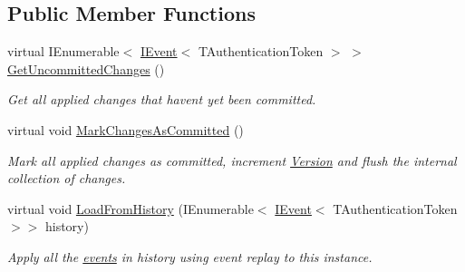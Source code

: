 \subsection*{Public Member Functions}
\begin{DoxyCompactItemize}
\item 
virtual I\+Enumerable$<$ \hyperlink{interfaceCqrs_1_1Events_1_1IEvent}{I\+Event}$<$ T\+Authentication\+Token $>$ $>$ \hyperlink{classCqrs_1_1Akka_1_1Domain_1_1AkkaAggregateRootProxy_afa620ced4762b0539da23ca063fed489_afa620ced4762b0539da23ca063fed489}{Get\+Uncommitted\+Changes} ()
\begin{DoxyCompactList}\small\item\em Get all applied changes that haven\textquotesingle{}t yet been committed. \end{DoxyCompactList}\item 
virtual void \hyperlink{classCqrs_1_1Akka_1_1Domain_1_1AkkaAggregateRootProxy_aaa8a46fee21b6133ae4d1b2f60983d7e_aaa8a46fee21b6133ae4d1b2f60983d7e}{Mark\+Changes\+As\+Committed} ()
\begin{DoxyCompactList}\small\item\em Mark all applied changes as committed, increment \hyperlink{classCqrs_1_1Akka_1_1Domain_1_1AkkaAggregateRootProxy_a24ff2ddef0d416ac5b936c1887ac2154_a24ff2ddef0d416ac5b936c1887ac2154}{Version} and flush the internal collection of changes. \end{DoxyCompactList}\item 
virtual void \hyperlink{classCqrs_1_1Akka_1_1Domain_1_1AkkaAggregateRootProxy_ae611077a51a215aef7fd0e106734b386_ae611077a51a215aef7fd0e106734b386}{Load\+From\+History} (I\+Enumerable$<$ \hyperlink{interfaceCqrs_1_1Events_1_1IEvent}{I\+Event}$<$ T\+Authentication\+Token $>$$>$ history)
\begin{DoxyCompactList}\small\item\em Apply all the \hyperlink{}{events} in {\itshape history}  using event replay to this instance. \end{DoxyCompactList}\end{DoxyCompactItemize}
